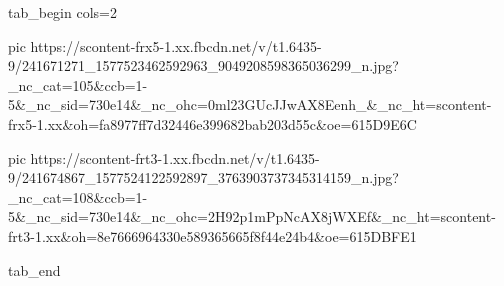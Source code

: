  
 
 
 
 

\ifcmt
  tab_begin cols=2

     pic https://scontent-frx5-1.xx.fbcdn.net/v/t1.6435-9/241671271_1577523462592963_9049208598365036299_n.jpg?_nc_cat=105&ccb=1-5&_nc_sid=730e14&_nc_ohc=0ml23GUcJJwAX8Eenh_&_nc_ht=scontent-frx5-1.xx&oh=fa8977ff7d32446e399682bab203d55c&oe=615D9E6C

     pic https://scontent-frt3-1.xx.fbcdn.net/v/t1.6435-9/241674867_1577524122592897_3763903737345314159_n.jpg?_nc_cat=108&ccb=1-5&_nc_sid=730e14&_nc_ohc=2H92p1mPpNcAX8jWXEf&_nc_ht=scontent-frt3-1.xx&oh=8e7666964330e589365665f8f44e24b4&oe=615DBFE1

  tab_end
\fi


